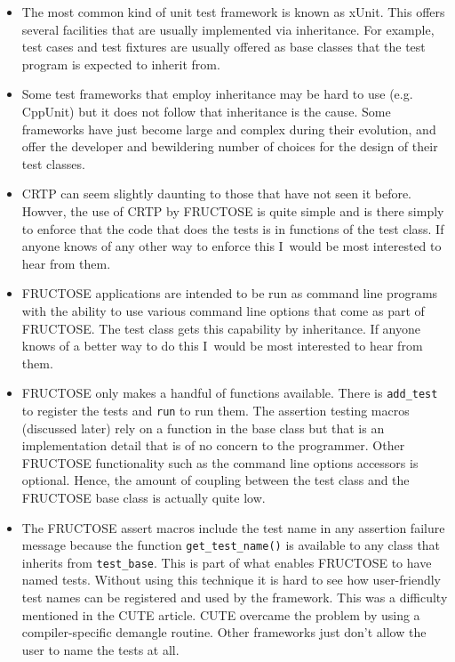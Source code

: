 \documentclass{book}
\begin{document}
\begin{itemize}
\item The most common kind of unit test framework is known as xUnit.
This offers several facilities that are usually implemented via
inheritance. For example, test cases and test fixtures are usually
offered as base classes that the test program is expected to inherit from.

\item Some test frameworks that employ inheritance may be hard to use
(e.g. CppUnit) but it does not follow that inheritance is the cause.
Some frameworks have just become large and complex during their evolution,
and offer the developer and bewildering number of choices for the design
of their test classes.

\item CRTP can seem slightly daunting to those that have not seen it before.
Howver, the use of CRTP by FRUCTOSE is quite simple and is there simply to
enforce that the code that does the tests is in functions of the test class.
If anyone knows of any other way to enforce this I~would be most
interested to hear from them.

\item FRUCTOSE applications are intended to be run as command line
programs with the ability to use various command line options that come
as part of FRUCTOSE. The test class gets this capability by inheritance.
If anyone knows of a better way to do this I~would be most
interested to hear from them.

\item FRUCTOSE only makes a handful of functions available.
There is {\tt add\_test} to register the tests and {\tt run} to run
them. The assertion testing macros (discussed later) rely on a function
in the base class but that is an implementation detail that is of no
concern to the programmer.
Other FRUCTOSE functionality such as the command line options accessors 
is optional.
Hence, the amount of coupling between the test class and the FRUCTOSE
base class is actually quite low.

\item The FRUCTOSE assert macros include the test name in any assertion
failure message because the function {\tt get\_test\_name()} is
available to any class that inherits from {\tt test\_base}.
This is part of what enables FRUCTOSE to have named tests.
Without using this technique it is hard to see how user-friendly
test names can be registered and used by the framework.
This was a difficulty mentioned in the CUTE article.
CUTE overcame the problem by using a compiler-specific demangle routine.
Other frameworks just don't allow the user to name the tests at all.


\end{itemize}
\end{document}

